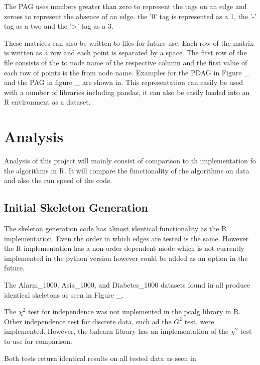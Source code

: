 \documentclass{UoYCSproject}
\begin{document}
The PAG uses numbers greater than zero to represent the tags on an edge and zeroes to represent the absence of an edge. the '0' tag is represented as a 1, the '-' tag as a two and the '>' tag as a 3.

These matrices can also be written to files for future use. Each row of the matrix is written as a row and each point is separated by a space. The first row of the file consists of the to node name of the respective column and the first value of each row of points is the from node name. Examples for the PDAG in Figure \_ and the PAG in figure  \_ are shown in.  This representation can easily be used with a number of libraries including pandas, it can also be easily loaded into an R environment as a dataset.
\chapter{Analysis}
Analysis of this project will mainly consist of comparison to th implementation fo the algorithms in R. It will compare the functionality of the algorithms on data and also the run speed of the code.

\section{Initial Skeleton Generation}
The skeleton generation code has almost identical functionality as the R implementation. Even the order in which edges are tested is the same. However the R implementation has a non-order dependent mode which is not currently implemented in the python version however could be added as an option in the future.

The Alarm\_1000, Asia\_1000, and Diabetes\_1000 datasets found in  all produce identical skeletons as seen in Figure \_.

The $\chi^2$ test for independence was not implemented in the pcalg library in R. Other independence test for discrete data, such ad the $G^2$ test, were implemented. However, the bnlearn library has an implementation of the $\chi^2$ test to use for comparison.

Both tests return identical results on all tested data as seen in
\end{document}
